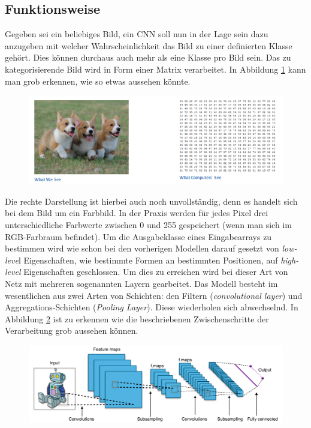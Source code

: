 \subsection{Funktionsweise}
Gegeben sei ein beliebiges Bild, ein CNN soll nun in der Lage sein dazu anzugeben mit welcher Wahrscheinlichkeit das Bild zu einer definierten Klasse gehört. Dies können durchaus auch mehr als eine Klasse pro Bild sein. Das zu kategorisierende Bild wird in Form einer Matrix verarbeitet. In Abbildung \ref{fig:puppies} kann man grob erkennen, wie so etwas aussehen könnte.

\begin{figure}[!htb]
	\centering
	\includegraphics[width=.9\linewidth]{img/humanVsPc}
	\label{fig:puppies}
\end{figure}

Die rechte Darstellung ist hierbei auch noch unvollständig, denn es handelt sich bei dem Bild um ein Farbbild. In der Praxis werden für jedes Pixel drei unterschiedliche Farbwerte zwischen 0 und 255 gespeichert (wenn man sich im RGB-Farbraum befindet). Um die Ausgabeklasse eines Eingabearrays zu bestimmen wird wie schon bei den vorherigen Modellen darauf gesetzt von \emph{low-leve}l Eigenschaften, wie bestimmte Formen an bestimmten Positionen, auf \emph{high-level} Eigenschaften geschlossen. Um dies zu erreichen wird bei dieser Art von Netz mit mehreren sogenannten Layern gearbeitet. Das Modell besteht im wesentlichen aus zwei Arten von Schichten: den Filtern (\emph{convolutional layer}) und Aggregations-Schichten (\emph{Pooling Layer}). Diese wiederholen sich abwechselnd. In Abbildung \ref{fig:cnnOverview} ist zu erkennen wie die beschriebenen Zwischenschritte der Verarbeitung grob aussehen können. 

\begin{figure}[!htb]
	\centering
	\includegraphics[width=.9\linewidth]{img/cnn_overview}
	\label{fig:cnnOverview}
\end{figure}

